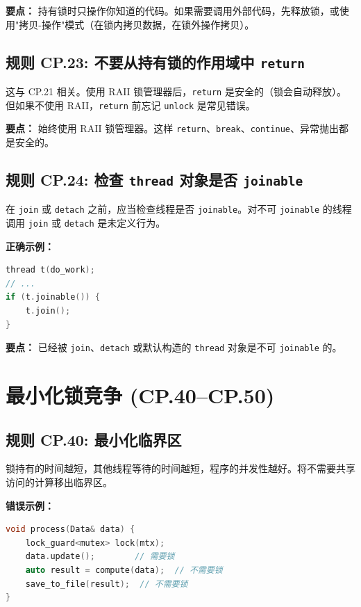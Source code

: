 \textbf{要点：} 持有锁时只操作你知道的代码。如果需要调用外部代码，先释放锁，或使用"拷贝-操作"模式（在锁内拷贝数据，在锁外操作拷贝）。

\subsection*{\textbf{规则 CP.23:} 不要从持有锁的作用域中 \texttt{return}}

这与 CP.21 相关。使用 RAII 锁管理器后，\texttt{return} 是安全的（锁会自动释放）。但如果不使用 RAII，\texttt{return} 前忘记 \texttt{unlock} 是常见错误。

\textbf{要点：} 始终使用 RAII 锁管理器。这样 \texttt{return}、\texttt{break}、\texttt{continue}、异常抛出都是安全的。

\subsection*{\textbf{规则 CP.24:} 检查 \texttt{thread} 对象是否 \texttt{joinable}}

在 \texttt{join} 或 \texttt{detach} 之前，应当检查线程是否 \texttt{joinable}。对不可 \texttt{joinable} 的线程调用 \texttt{join} 或 \texttt{detach} 是未定义行为。

\textbf{正确示例：}

\begin{lstlisting}[language=C++]
thread t(do_work);
// ...
if (t.joinable()) {
    t.join();
}
\end{lstlisting}

\textbf{要点：} 已经被 \texttt{join}、\texttt{detach} 或默认构造的 \texttt{thread} 对象是不可 \texttt{joinable} 的。

\section{最小化锁竞争 (CP.40--CP.50)}

\subsection*{\textbf{规则 CP.40:} 最小化临界区}

锁持有的时间越短，其他线程等待的时间越短，程序的并发性越好。将不需要共享访问的计算移出临界区。

\textbf{错误示例：}

\begin{lstlisting}[language=C++]
void process(Data& data) {
    lock_guard<mutex> lock(mtx);
    data.update();        // 需要锁
    auto result = compute(data);  // 不需要锁
    save_to_file(result);  // 不需要锁
}
\end{lstlisting}

